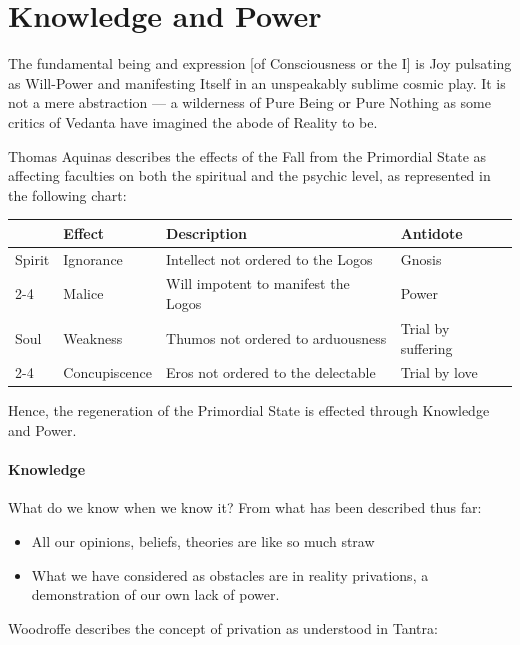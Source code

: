 \section{Knowledge and Power}

\begin{quotex}
The fundamental being and expression [of Consciousness or the I] is Joy pulsating as Will-Power and manifesting Itself in an unspeakably sublime cosmic play. It is not a mere abstraction — a wilderness of Pure Being or Pure Nothing as some critics of Vedanta have imagined the abode of Reality to be. 

\end{quotex}
Thomas Aquinas describes the effects of the Fall from the Primordial State as affecting faculties on both the spiritual and the psychic level, as represented in the following chart:

\begin{table}[h]
\centering\small
\begin{tabularx}{\textwidth}{llp{}l}
\toprule
 &
\textbf{Effect} &
\textbf{Description} &
\textbf{Antidote}\\\midrule
Spirit &
Ignorance &
Intellect not ordered to the Logos &
Gnosis\\\cmidrule{2-4}
 &
Malice &
Will impotent to manifest the Logos &
Power\\\midrule
Soul &
Weakness &
Thumos not ordered to arduousness &
Trial by suffering\\\cmidrule{2-4}
 &
Concupiscence &
Eros not ordered to the delectable &
Trial by love\\\bottomrule
\end{tabularx}
\end{table}
Hence, the regeneration of the Primordial State is effected through Knowledge and Power.

\paragraph{Knowledge}
What do we know when we know it? From what has been described thus far:

\begin{itemize}
\item All our opinions, beliefs, theories are like so much straw 
\item What we have considered as obstacles are in reality privations, a demonstration of our own lack of power. 
\end{itemize}
Woodroffe describes the concept of privation as understood in Tantra:

